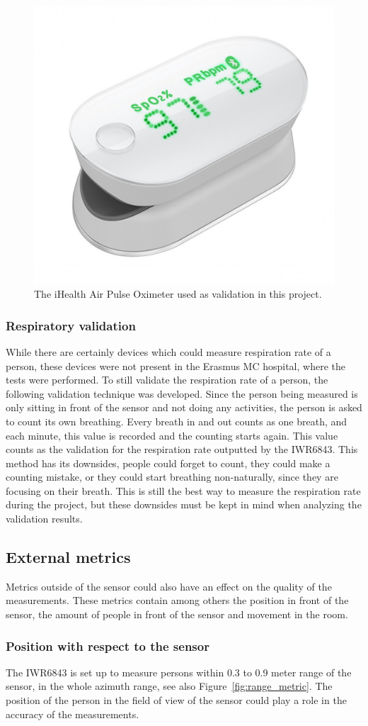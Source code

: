 \begin{figure}[t]
    \centering
    \includegraphics[width=.4\textwidth]{figures/validation/ihealth.jpg}
    \caption{The iHealth Air Pulse Oximeter used as validation in this project.}
    \label{fig:ihealth}
\end{figure}

\subsubsection{Respiratory validation}
While there are certainly devices which could measure respiration rate of a person, these devices were not present in the Erasmus MC hospital, where the tests were performed. To still validate the respiration rate of a person, the following validation technique was developed. Since the person being measured is only sitting in front of the sensor and not doing any activities, the person is asked to count its own breathing. Every breath in and out counts as one breath, and each minute, this value is recorded and the counting starts again. This value counts as the validation for the respiration rate outputted by the IWR6843. This method has its downsides, people could forget to count, they could make a counting mistake, or they could start breathing non-naturally, since they are focusing on their breath. This is still the best way to measure the respiration rate during the project, but these downsides must be kept in mind when analyzing the validation results.

\subsection{External metrics}
Metrics outside of the sensor could also have an effect on the quality of the measurements. These metrics contain among others the position in front of the sensor, the amount of people in front of the sensor and movement in the room.

\subsubsection{Position with respect to the sensor}
The IWR6843 is set up to measure persons within 0.3 to 0.9 meter range of the sensor, in the whole azimuth range, see also Figure~\ref{fig:range_metric}. The position of the person in the field of view of the sensor could play a role in the accuracy of the measurements.

